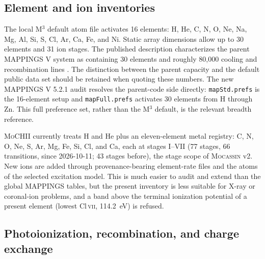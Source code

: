 \documentclass[english,a4paper]{my_memo}
\newcommand{\code}[1]{\texttt{#1}}
\newcommand{\MoCHII}{\textsc{MoCHII}}
\newcommand{\Mthree}{M$^3$}
\newcommand{\Mappings}{MAPPINGS V 5.2.1}
\newcommand{\Mocassin}{\textsc{Mocassin}}
\begin{document}
\subsection{Element and ion inventories}

The local \Mthree{} default atom file activates 16 elements:
H, He, C, N, O, Ne, Na, Mg, Al, Si, S, Cl, Ar, Ca, Fe, and Ni.  Static
array dimensions allow up to 30 elements and 31 ion stages.  The published
description characterizes the parent MAPPINGS V system as containing 30
elements and roughly 80,000 cooling and recombination lines
\cite{jin2022}.  The distinction between the parent capacity and the
default public data set should be retained when quoting these numbers.
The new \Mappings{} audit resolves the parent-code side directly:
\code{mapStd.prefs} is the 16-element setup and \code{mapFull.prefs}
activates 30 elements from H through Zn.  This full preference set, rather
than the \Mthree{} default, is the relevant breadth reference.

\MoCHII{} currently treats H and He plus an eleven-element metal registry:
C, N, O, Ne, S, Ar, Mg, Fe, Si, Cl, and Ca, each at stages I--VII (77
stages, 66 transitions, since 2026-10-11; 43 stages before), the stage
scope of \Mocassin{} v2.  New ions are added through provenance-bearing
element-rate files and the atoms of the selected excitation model. This is
much easier to audit and extend than the global MAPPINGS tables, but the
present inventory is less suitable for X-ray or coronal-ion problems, and a
band above the terminal ionization potential of a present element (lowest
Cl\,\textsc{vii}, 114.2~eV) is refused.

\subsection{Photoionization, recombination, and charge exchange}
\label{sec:recombdata}
\end{document}
